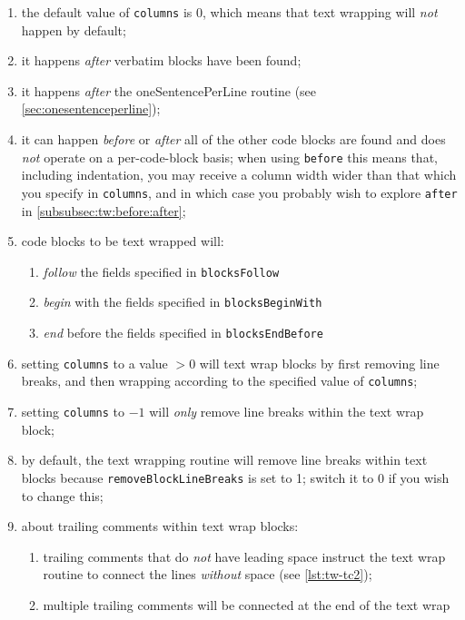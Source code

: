  \begin{enumerate}
  \item the default value of \texttt{columns} is 0, which means that text wrapping will
        \emph{not} happen by default;
  \item it happens \emph{after} verbatim blocks have been found;
  \item it happens \emph{after} the oneSentencePerLine routine (see
        \cref{sec:onesentenceperline});
  \item it can happen \emph{before} or \emph{after}  all of the other code blocks are found and does \emph{not} operate
        on a per-code-block basis; when using \texttt{before} this means that, including
        indentation, you may receive a column width wider than that which you specify in
        \texttt{columns}, and in which case you probably wish to explore \texttt{after}
        in \cref{subsubsec:tw:before:after};
  \item code blocks to be text wrapped will:
        \begin{enumerate}
         \item \emph{follow} the fields specified in \texttt{blocksFollow}
         \item \emph{begin} with the fields specified in \texttt{blocksBeginWith}
         \item \emph{end} before the fields specified in \texttt{blocksEndBefore}
        \end{enumerate}
  \item setting \texttt{columns} to a value $>0$ will text wrap blocks by first removing
        line breaks, and then wrapping according to the specified value of
        \texttt{columns};
  \item setting \texttt{columns} to $-1$ will \emph{only} remove line breaks within the
        text wrap block;
  \item by default, the text wrapping routine will remove line breaks within text blocks
        because \texttt{removeBlockLineBreaks} is set to 1; switch it to 0 if you wish to
        change this;
  \item about trailing comments within text wrap blocks:
        \begin{enumerate}
         \item trailing comments that do \emph{not} have leading space instruct the text
               wrap routine to connect the lines \emph{without} space (see
               \cref{lst:tw-tc2});
         \item multiple trailing comments will be connected at the end of the text wrap

\end{enumerate}
\end{enumerate}
